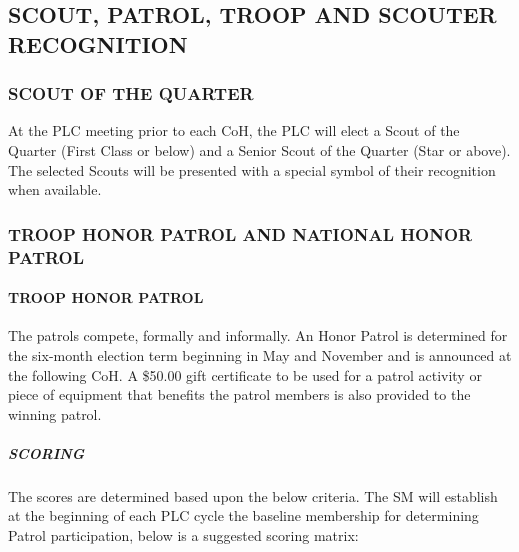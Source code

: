 \documentclass{ltxguide}
\begin{document}
\subsection{SCOUT, PATROL, TROOP AND SCOUTER RECOGNITION}
\subsubsection{SCOUT OF THE QUARTER}
At the \ac{PLC} meeting prior to each \ac{CoH}, the \ac{PLC} will elect a Scout of the Quarter (First Class or below) and a Senior Scout of the Quarter (Star or above). The selected Scouts will be presented with a special symbol of their recognition when available.

\subsubsection{TROOP HONOR PATROL AND NATIONAL HONOR PATROL}
\paragraph{TROOP HONOR PATROL}
The patrols compete, formally and informally. An Honor Patrol is determined for the six-month election term beginning in May and November and is announced at the following \ac{CoH}. A \$50.00 gift certificate to be used for a patrol activity or piece of equipment that benefits the patrol members is also provided to the winning patrol.

\subparagraph{SCORING}
The scores are determined based upon the below criteria. The \ac{SM} will establish at the beginning of each \ac{PLC} cycle the baseline membership for determining Patrol participation, below is a suggested scoring matrix:
\end{document}
